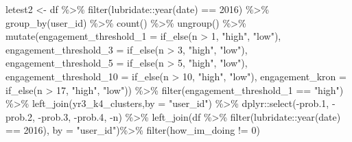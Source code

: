 \documentclass[
]{article}
\newenvironment{Shaded}{\begin{snugshade}}{\end{snugshade}}
\newcommand{\AttributeTok}[1]{\textcolor[rgb]{0.77,0.63,0.00}{#1}}
\newcommand{\DecValTok}[1]{\textcolor[rgb]{0.00,0.00,0.81}{#1}}
\newcommand{\FloatTok}[1]{\textcolor[rgb]{0.00,0.00,0.81}{#1}}
\newcommand{\FunctionTok}[1]{\textcolor[rgb]{0.00,0.00,0.00}{#1}}
\newcommand{\NormalTok}[1]{#1}
\newcommand{\OtherTok}[1]{\textcolor[rgb]{0.56,0.35,0.01}{#1}}
\newcommand{\SpecialCharTok}[1]{\textcolor[rgb]{0.00,0.00,0.00}{#1}}
\newcommand{\StringTok}[1]{\textcolor[rgb]{0.31,0.60,0.02}{#1}}
\begin{document}
\begin{Shaded}
\begin{Highlighting}[]
\NormalTok{letest2 }\OtherTok{\textless{}{-}}\NormalTok{  df }\SpecialCharTok{\%\textgreater{}\%}
  \FunctionTok{filter}\NormalTok{(lubridate}\SpecialCharTok{::}\FunctionTok{year}\NormalTok{(date) }\SpecialCharTok{==} \DecValTok{2016}\NormalTok{) }\SpecialCharTok{\%\textgreater{}\%}
  \FunctionTok{group\_by}\NormalTok{(user\_id) }\SpecialCharTok{\%\textgreater{}\%}
  \FunctionTok{count}\NormalTok{() }\SpecialCharTok{\%\textgreater{}\%}
  \FunctionTok{ungroup}\NormalTok{() }\SpecialCharTok{\%\textgreater{}\%} 
  \FunctionTok{mutate}\NormalTok{(}\AttributeTok{engagement\_threshold\_1 =} \FunctionTok{if\_else}\NormalTok{(n }\SpecialCharTok{\textgreater{}} \DecValTok{1}\NormalTok{, }\StringTok{"high"}\NormalTok{, }\StringTok{"low"}\NormalTok{),}
         \AttributeTok{engagement\_threshold\_3 =} \FunctionTok{if\_else}\NormalTok{(n }\SpecialCharTok{\textgreater{}} \DecValTok{3}\NormalTok{, }\StringTok{"high"}\NormalTok{, }\StringTok{"low"}\NormalTok{),}
         \AttributeTok{engagement\_threshold\_5 =} \FunctionTok{if\_else}\NormalTok{(n }\SpecialCharTok{\textgreater{}} \DecValTok{5}\NormalTok{, }\StringTok{"high"}\NormalTok{, }\StringTok{"low"}\NormalTok{),}
         \AttributeTok{engagement\_threshold\_10 =} \FunctionTok{if\_else}\NormalTok{(n }\SpecialCharTok{\textgreater{}} \DecValTok{10}\NormalTok{, }\StringTok{"high"}\NormalTok{, }\StringTok{"low"}\NormalTok{),}
         \AttributeTok{engagement\_kron =} \FunctionTok{if\_else}\NormalTok{(n }\SpecialCharTok{\textgreater{}} \DecValTok{17}\NormalTok{, }\StringTok{"high"}\NormalTok{, }\StringTok{"low"}\NormalTok{)) }\SpecialCharTok{\%\textgreater{}\%} 
  \FunctionTok{filter}\NormalTok{(engagement\_threshold\_1 }\SpecialCharTok{==} \StringTok{"high"}\NormalTok{) }\SpecialCharTok{\%\textgreater{}\%} 
  \FunctionTok{left\_join}\NormalTok{(yr3\_k4\_clusters,}\AttributeTok{by =} \StringTok{"user\_id"}\NormalTok{) }\SpecialCharTok{\%\textgreater{}\%} 
\NormalTok{  dplyr}\SpecialCharTok{::}\FunctionTok{select}\NormalTok{(}\SpecialCharTok{{-}}\NormalTok{prob}\FloatTok{.1}\NormalTok{,}
          \SpecialCharTok{{-}}\NormalTok{prob}\FloatTok{.2}\NormalTok{,}
          \SpecialCharTok{{-}}\NormalTok{prob}\FloatTok{.3}\NormalTok{,}
          \SpecialCharTok{{-}}\NormalTok{prob}\FloatTok{.4}\NormalTok{,}
          \SpecialCharTok{{-}}\NormalTok{n) }\SpecialCharTok{\%\textgreater{}\%} 
  \FunctionTok{left\_join}\NormalTok{(df }\SpecialCharTok{\%\textgreater{}\%}
  \FunctionTok{filter}\NormalTok{(lubridate}\SpecialCharTok{::}\FunctionTok{year}\NormalTok{(date) }\SpecialCharTok{==} \DecValTok{2016}\NormalTok{),}
         \AttributeTok{by =} \StringTok{"user\_id"}\NormalTok{)}\SpecialCharTok{\%\textgreater{}\%}
  \FunctionTok{filter}\NormalTok{(how\_im\_doing }\SpecialCharTok{!=} \DecValTok{0}\NormalTok{)}



\end{Highlighting}
\end{Shaded}
\end{document}
